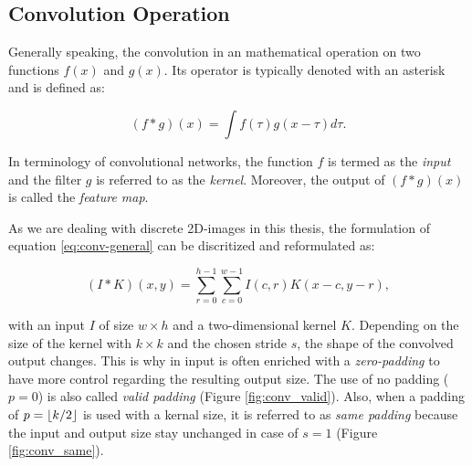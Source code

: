 \subsection{Convolution Operation} \label{sec:conv-op}

Generally speaking, the convolution in an mathematical operation on two functions $f(x)$ and $g(x)$. Its operator is typically denoted with an asterisk \parencite[p. 332]{deep_learning} and is defined as:

\begin{equation} \label{eq:conv-general}
  (f \ast g)(x) = \int f(\tau)g(x-\tau) d\tau .
\end{equation}

In terminology of convolutional networks, the function $f$ is termed as the \textit{input} and the filter $g$ is referred to as the \textit{kernel}. Moreover, the output of $ (f \ast g)(x) $ is called the \textit{feature map}.

As we are dealing with discrete 2D-images in this thesis, the formulation of equation \ref{eq:conv-general} can be discritized and reformulated as:

\begin{equation} \label{eq:conv-2d}
  (I \ast K)(x,y) = \sum\limits_{r=0}^{h-1} \sum\limits_{c=0}^{w-1} I(c,r)K(x-c,y-r) ,
\end{equation}

with an input $ I $ of size $w \times h$ and a two-dimensional kernel $ K $. Depending on the size of the kernel with $ k \times k $ and the chosen stride $ s $, the shape of the convolved output changes. This is why in input is often enriched with a \textit{zero-padding} to have more control regarding the resulting output size. The use of no padding ($p=0$) is also called \textit{valid padding} (Figure \ref{fig:conv_valid}). Also, when a padding of $p=\lfloor k/2\rfloor$ is used with a kernal size, it is referred to as \textit{same padding} because the input and output size stay unchanged in case of $ s=1 $ (Figure \ref{fig:conv_same}). 

